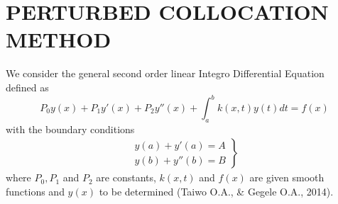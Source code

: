 \documentclass[12pt]{report}
\newcommand{\IDE}{Integro Differential Equation}
\newcommand{\sprime}{'}
\newcommand{\dprime}{''}
\begin{document}
	\chapter{PERTURBED COLLOCATION METHOD}
	We consider the general second order linear \IDE~ defined as 
	\begin{equation}
			P_0y(x) + P_1y\sprime(x) + P_2y\dprime(x) + \int_a^b k(x,t)y(t)dt=f(x) \label{eq:4_1}
	\end{equation}
	with the boundary conditions
	\begin{eqnarray}
		\left.
		\begin{array}{c}
			y(a) + y\sprime(a) = A\\
			y(b) + y\dprime(b) = B
		\end{array}\right\}
		\label{eq:4_2}
	\end{eqnarray}
	where $P_0, P_1$ and $P_2$ are constants, $k(x,t)$ and $f(x)$ are given smooth functions and $y(x)$ to be determined (Taiwo O.A., \& Gegele O.A., 2014).
	
	
\end{document}
